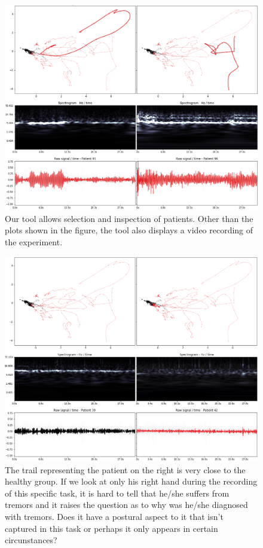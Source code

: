 \begin{figure}[ht]
\centering
\includegraphics[width=\linewidth]{figures/nemo/exp1-9196.png}
\caption{Our tool allows selection and inspection of patients. Other than the plots shown in the figure, the tool also displays a video recording of the experiment. }
\label{fig:exp1-9196}
\end{figure}

\begin{figure}[ht]
\centering
\includegraphics[width=\linewidth]{figures/nemo/exp1-3942.png}
\caption{The trail representing the patient on the right is very close to the healthy group. If we look at only his right hand during the recording of this specific task, it is hard to tell that he/she suffers from tremors and it raises the question as to why was he/she diagnosed with tremors. Does it have a postural aspect to it that isn't captured in this task or perhaps it only appears in certain circunstances?}
\label{fig:exp1-3942}
\end{figure}

